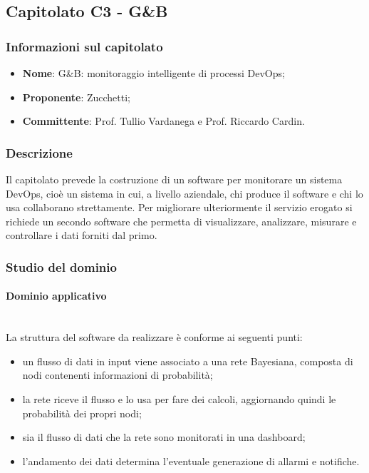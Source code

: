 \subsection{Capitolato C3 - G\&B}
\subsubsection{Informazioni sul capitolato}
\begin{itemize}
	\item \textbf{Nome}: G\&B: monitoraggio intelligente di processi DevOps;
	\item \textbf{Proponente}: Zucchetti;
	\item \textbf{Committente}: Prof. Tullio Vardanega e Prof. Riccardo Cardin.
\end{itemize}
\subsubsection{Descrizione}
Il capitolato prevede la costruzione di un software per monitorare un sistema 
DevOps, cioè un sistema in cui, a livello aziendale, chi produce il software 
e chi lo usa collaborano strettamente. Per migliorare ulteriormente il servizio 
erogato si richiede un secondo software che permetta di visualizzare, 
analizzare, misurare e controllare i dati forniti dal primo.
\subsubsection{Studio del dominio}
\paragraph{Dominio applicativo} \mbox{}\\
La struttura del software da realizzare è conforme ai seguenti punti: 
\begin{itemize}
	\item un flusso di dati in input viene associato a una rete Bayesiana, 
	composta di nodi contenenti informazioni di probabilità;
	\item la rete riceve il flusso e lo usa per fare dei calcoli, aggiornando
	 quindi le probabilità dei propri nodi;
	\item sia il flusso di dati che la rete sono monitorati in una dashboard;
	\item l'andamento dei dati determina l'eventuale generazione di allarmi
	 e notifiche.
\end{itemize}
